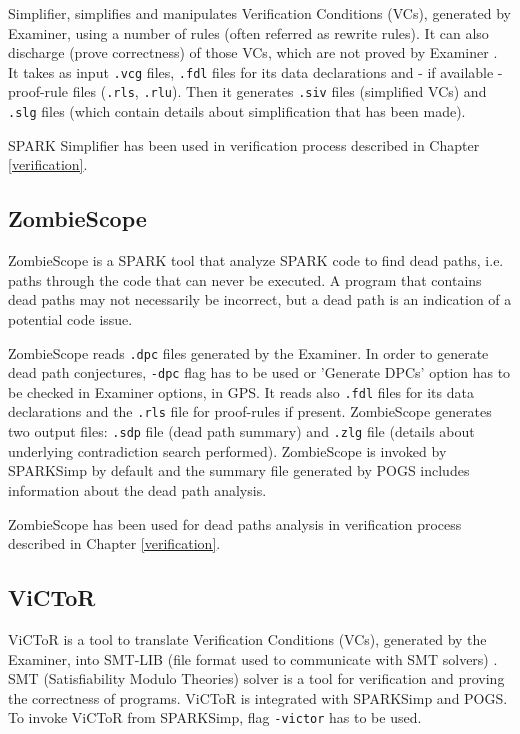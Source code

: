 Simplifier, simplifies and manipulates Verification Conditions (VCs), generated by Examiner, using a number of rules (often referred as rewrite rules). It can also discharge (prove correctness) of those VCs, which are not proved by Examiner \cite{Simplifier:Online}. It takes as input \lstinline{.vcg} files, \lstinline{.fdl} files for its data declarations and - if available - proof-rule files (\lstinline{.rls}, \lstinline{.rlu}). Then it generates \lstinline{.siv} files (simplified VCs) and \lstinline{.slg} files (which contain details about simplification that has been made).

SPARK Simplifier has been used in verification process described in Chapter \ref{verification}.



\subsection{ZombieScope}
\label{background:sparkverification:zombiescope}

ZombieScope is a SPARK tool that analyze SPARK code to find dead paths, i.e. paths through the code that can never be executed. A program that contains dead paths may not necessarily be incorrect, but a dead path is an indication of a potential code issue.

ZombieScope reads \lstinline{.dpc} files generated by the Examiner. In order to generate dead path conjectures, \lstinline{-dpc} flag has to be used or 'Generate DPCs' option has to be checked in Examiner options, in GPS. It reads also \lstinline{.fdl} files for its data declarations and the \lstinline{.rls} file for proof-rules if present. ZombieScope generates two output files: \lstinline{.sdp} file (dead path summary) and \lstinline{.zlg} file (details about underlying contradiction search performed). ZombieScope is invoked by SPARKSimp by default and the summary file generated by POGS includes information about the dead path analysis.

ZombieScope has been used for dead paths analysis in verification process described in Chapter \ref{verification}.



\subsection{ViCToR}
\label{background:sparkverification:victor}

ViCToR is a tool to translate Verification Conditions (VCs), generated by the Examiner, into SMT-LIB (file format used to communicate with SMT solvers) \cite{Victor:Online}. SMT (Satisfiability Modulo Theories) solver is a tool for verification and proving the correctness of programs. ViCToR is integrated with SPARKSimp and POGS. To invoke ViCToR from SPARKSimp, flag \lstinline{-victor} has to be used.

